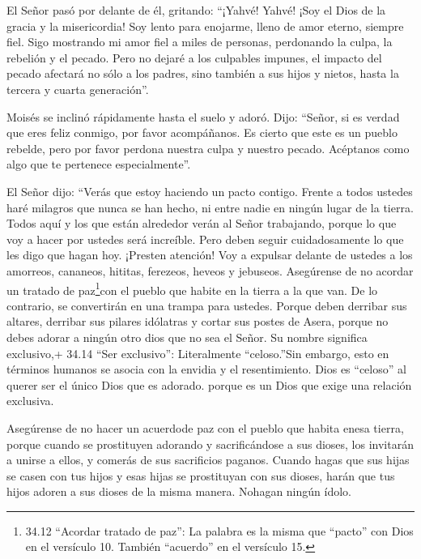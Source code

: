  El Señor pasó por delante de él, gritando: ``¡Yahvé! Yahvé!
¡Soy el Dios de la gracia y la misericordia! Soy lento para enojarme,
lleno de amor eterno, siempre fiel.  Sigo mostrando mi amor
fiel a miles de personas, perdonando la culpa, la rebelión y el pecado.
Pero no dejaré a los culpables impunes, el impacto del pecado afectará
no sólo a los padres, sino también a sus hijos y nietos, hasta la
tercera y cuarta generación''.

 Moisés se inclinó rápidamente hasta el suelo y adoró.
 Dijo: ``Señor, si es verdad que eres feliz conmigo, por
favor acompáñanos. Es cierto que este es un pueblo rebelde, pero por
favor perdona nuestra culpa y nuestro pecado. Acéptanos como algo que te
pertenece especialmente''.

 El Señor dijo: ``Verás que estoy haciendo un pacto
contigo. Frente a todos ustedes haré milagros que nunca se han hecho, ni
entre nadie en ningún lugar de la tierra. Todos aquí y los que están
alrededor verán al Señor trabajando, porque lo que voy a hacer por
ustedes será increíble.  Pero deben seguir cuidadosamente
lo que les digo que hagan hoy. ¡Presten atención! Voy a expulsar delante
de ustedes a los amorreos, cananeos, hititas, ferezeos, heveos y
jebuseos.  Asegúrense de no acordar un tratado de
paz\footnote{34.12 ``Acordar tratado de paz'': La palabra es la misma
  que ``pacto'' con Dios en el versículo 10. También ``acuerdo'' en el
  versículo 15.}con el pueblo que habite en la tierra a la que van. De
lo contrario, se convertirán en una trampa para ustedes. 
Porque deben derribar sus altares, derribar sus pilares idólatras y
cortar sus postes de Asera,  porque no debes adorar a
ningún otro dios que no sea el Señor. Su nombre significa exclusivo,+
34.14 ``Ser exclusivo'': Literalmente ``celoso.''Sin embargo, esto en
términos humanos se asocia con la envidia y el resentimiento. Dios es
``celoso'' al querer ser el único Dios que es adorado. porque es un Dios
que exige una relación exclusiva.

 Asegúrense de no hacer un acuerdode paz con el pueblo que
habita enesa tierra, porque cuando se prostituyen adorando y
sacrificándose a sus dioses, los invitarán a unirse a ellos, y comerás
de sus sacrificios paganos.  Cuando hagas que sus hijas se
casen con tus hijos y esas hijas se prostituyan con sus dioses, harán
que tus hijos adoren a sus dioses de la misma manera. 
Nohagan ningún ídolo.

